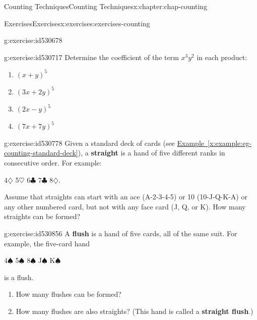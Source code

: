 \documentclass[oneside,10pt,]{book}
\newcommand{\xreffont}{\relax}
\newcommand{\terminology}[1]{\textbf{#1}}
\numberwithin{equation}{section}
\begin{document}
\begin{chapterptx}{Counting Techniques}{}{Counting Techniques}{}{}{x:chapter:chap-counting}
\begin{exercises-section}{Exercises}{}{Exercises}{}{}{x:exercises:exercises-counting}
\begin{divisionexercise}{6}{}{}{g:exercise:id530678}
\end{divisionexercise}%
\begin{divisionexercise}{7}{}{}{g:exercise:id530717}%
Determine the coefficient of the term \(x^3y^2\) in each product:%
\begin{enumerate}[label=(\alph*)]
\item{}\(\displaystyle (x+y)^5\)%
\item{}\(\displaystyle (3x+2y)^5\)%
\item{}\(\displaystyle (2x-y)^5\)%
\item{}\(\displaystyle (7x + 7y)^5\)%
\end{enumerate}
%
\end{divisionexercise}%
\begin{divisionexercise}{8}{}{}{g:exercise:id530778}%
Given a standard deck of cards (see \hyperref[x:example:eg-counting-standard-deck]{Example~{\xreffont\ref{x:example:eg-counting-standard-deck}}}), a \terminology{straight} is a hand of five different ranks in consecutive order. For example:%
\begin{sidebyside}{1}{0.3}{0.3}{0}%
\begin{sbspanel}{0.4}%
4\(\diamondsuit\) 5\(\heartsuit\) 6\(\clubsuit\) 7\(\clubsuit\) 8\(\diamondsuit\).%
\end{sbspanel}%
\end{sidebyside}%
\par
Assume that straights can start with an ace (A-2-3-4-5) or 10 (10-J-Q-K-A) or any other numbered card, but not with any face card (J, Q, or K). How many straights can be formed?%
\end{divisionexercise}%
\begin{divisionexercise}{9}{}{}{g:exercise:id530856}%
A \terminology{flush} is a hand of five cards, all of the same suit. For example, the five-card hand%
\begin{sidebyside}{1}{0.3}{0.3}{0}%
\begin{sbspanel}{0.4}%
4\(\spadesuit\) 5\(\spadesuit\) 8\(\spadesuit\) J\(\spadesuit\) K\(\spadesuit\)%
\end{sbspanel}%
\end{sidebyside}%
\par
is a flush.%
\par
%
\begin{enumerate}[label=(\alph*)]
\item{}How many flushes can be formed?%
\item{}How many flushes are also straights? (This hand is called a \terminology{straight flush}.)%

\end{enumerate}
\end{divisionexercise}
\end{exercises-section}
\end{chapterptx}
\end{document}

